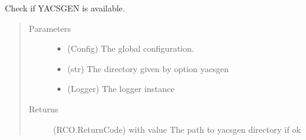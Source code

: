 \documentclass[a4paper,10pt,english]{sphinxmanual}
\begin{document}
\begin{fulllineitems}
\label{\detokenize{apidoc_commands/commands:commands.generate.check_yacsgen}}
Check if YACSGEN is available.
\begin{quote}\begin{description}
\item[{Parameters}] \leavevmode\begin{itemize}
\item {} 
 \textendash{} (Config) The global configuration.

\item {} 
 \textendash{} (str) The directory given by option \textendash{}yacsgen

\item {} 
 \textendash{} (Logger) The logger instance

\end{itemize}

\item[{Returns}] \leavevmode
(RCO.ReturnCode) 
with value The path to yacsgen directory if ok

\end{description}\end{quote}

\end{fulllineitems}


\begin{fulllineitems}
\label{\detokenize{apidoc_commands/commands:commands.generate.generate_component}}
\end{fulllineitems}


\begin{fulllineitems}
\label{\detokenize{apidoc_commands/commands:commands.generate.generate_component_list}}
\end{fulllineitems}
\end{document}
